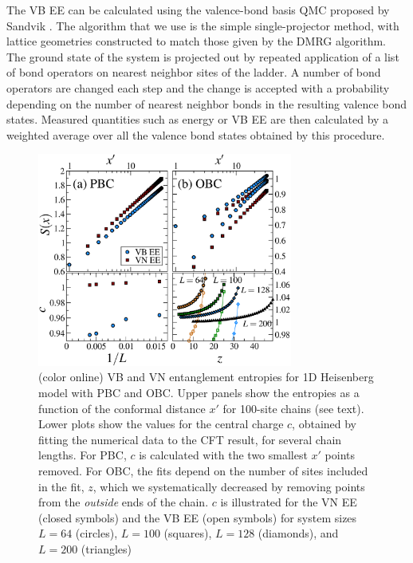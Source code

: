 \documentclass[prl,aps,twocolumn,floatfix,amsmath,amssymb,superscriptaddress,tightenlines]{revtex4}
\begin{document}
The VB EE \cite{Alet,Chh} can be calculated using the valence-bond basis
QMC proposed by Sandvik \cite{Sandvik}.  The 
algorithm that we use is the simple single-projector method, with lattice
geometries constructed to match those given by the DMRG algorithm.  The
ground state of the system is projected out by repeated application of a
list of bond operators on nearest neighbor sites of the ladder.  A number
of bond operators are changed each step and the change is accepted
with a probability depending on the number of nearest neighbor bonds in
the resulting valence bond states. Measured quantities such as energy or
VB EE are then calculated by a weighted average over all the valence bond
states obtained by this procedure.

\begin{figure} {
\includegraphics[width=3.3in]{4-panelFIG1.eps} \caption{(color online) VB
and VN entanglement entropies for 1D Heisenberg model with PBC and OBC. Upper panels show the entropies as a
function of the conformal distance $x'$ for 100-site chains (see text).
Lower plots show the values for the central charge $c$, obtained by
fitting the numerical data to the CFT result, for several chain lengths.
For PBC, $c$ is calculated with the two smallest $x'$ points removed.
For OBC, the fits depend on the number of sites included in the fit, $z$,
which we
systematically decreased by
removing points from the {\it outside} ends of the chain.
$c$ is illustrated for the VN EE (closed symbols) and the VB EE (open
symbols) for system sizes $L=64$ (circles), $L=100$ (squares), $L=128$
(diamonds), and $L=200$ (triangles) \label{1D}}} \end{figure}
\end{document}
